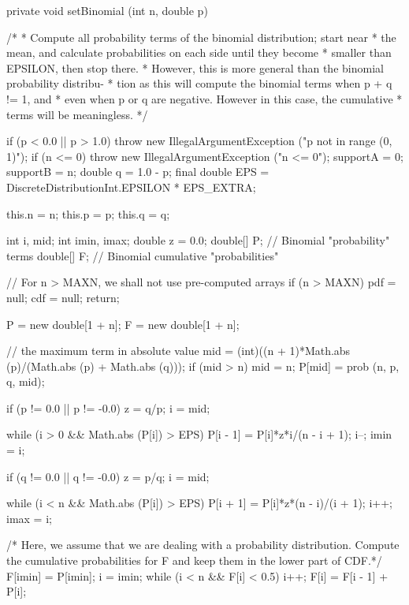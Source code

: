 \begin{code}
 \begin{hide}
   private void setBinomial (int n, double p) {
     /*
      * Compute all probability terms of the binomial distribution; start near
      * the mean, and calculate probabilities on each side until they become
      * smaller than EPSILON, then stop there.
      * However, this is more general than the binomial probability distribu-
      * tion as this will compute the binomial terms when p + q != 1, and
      * even when p or q are negative. However in this case, the cumulative
      * terms will be meaningless.
      */

      if (p < 0.0 || p > 1.0)
         throw new IllegalArgumentException ("p not in range (0, 1)");
      if (n <= 0)
         throw new IllegalArgumentException ("n <= 0");
      supportA = 0;
      supportB = n;
      double q = 1.0 - p;
      final double EPS = DiscreteDistributionInt.EPSILON * EPS_EXTRA;

      this.n = n;
      this.p = p;
      this.q = q;

      int i, mid;
      int imin, imax;
      double z = 0.0;
      double[] P;     // Binomial "probability" terms
      double[] F;     // Binomial cumulative "probabilities"

      // For n > MAXN, we shall not use pre-computed arrays
      if (n > MAXN) {
         pdf = null;
         cdf = null;
         return;
      }

      P = new double[1 + n];
      F = new double[1 + n];

      // the maximum term in absolute value
      mid = (int)((n + 1)*Math.abs (p)/(Math.abs (p) + Math.abs (q)));
      if (mid > n)
         mid = n;
      P[mid] = prob (n, p, q, mid);

      if (p != 0.0 || p != -0.0)
         z = q/p;
      i = mid;

      while (i > 0 && Math.abs (P[i]) > EPS) {
         P[i - 1] = P[i]*z*i/(n - i + 1);
         i--;
      }
      imin = i;

      if (q != 0.0 || q != -0.0)
         z = p/q;
      i = mid;

      while (i < n && Math.abs (P[i]) > EPS) {
         P[i + 1] = P[i]*z*(n - i)/(i + 1);
         i++;
      }
      imax = i;

   /* Here, we assume that we are dealing with a probability distribution.
      Compute the cumulative probabilities for F and keep them in the
      lower part of CDF.*/
      F[imin] = P[imin];
      i = imin;
      while (i < n && F[i] < 0.5) {
         i++;
         F[i] = F[i - 1] + P[i];
      }

}
\end{hide}
\end{code}
